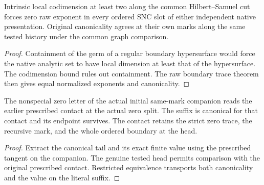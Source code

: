 \begin{theorem}
\label{hir:g1-native-codimension-two-traces}
\leanok
Intrinsic local codimension at least two along the common
Hilbert--Samuel cut forces zero raw exponent in every
ordered SNC slot of either independent native presentation.
Original canonicality agrees at their own marks along the
same tested history under the common graph comparison.
\end{theorem}
\begin{proof}
Containment of the germ of a regular boundary hypersurface
would force the native analytic set to have local dimension
at least that of the hypersurface. The codimension bound
rules out containment. The raw boundary trace theorem
then gives equal normalized exponents and canonicality.
\end{proof}

\begin{theorem}
\label{hir:g1-advancing-order-zero-contact}
\leanok
The nonspecial zero letter of the actual initial same-mark
companion reads the earlier prescribed contact at the actual
zero split. The suffix is canonical for that contact and its
endpoint survives. The contact retains the strict zero trace,
the recursive mark, and the whole ordered boundary at the head.
\end{theorem}
\begin{proof}
Extract the canonical tail and its exact finite value using the
prescribed tangent on the companion. The genuine tested head
permits comparison with the original prescribed contact.
Restricted equivalence transports both canonicality and the value
on the literal suffix.
\end{proof}

